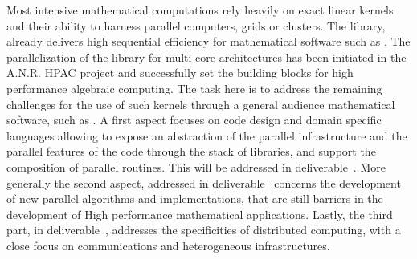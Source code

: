\begin{workpackage}
\begin{tasklist}
\begin{task}[title=Linbox,PM=40,id=hpc-linbox, lead=UJF,wphases={3-48!0.37,12-36}]
Most intensive mathematical computations rely heavily on exact linear kernels
and their ability to harness parallel computers, grids or clusters. The \Linbox
library, already delivers high sequential efficiency for mathematical software
such as \Sage. The parallelization of the library for multi-core architectures
has been initiated in the A.N.R. HPAC project and successfully set the building
blocks for high performance algebraic computing. 
The task here is to  address the remaining challenges for the use of such
kernels through a general audience mathematical software, such as \Sage.
A first aspect focuses on code design and domain specific languages allowing to
expose an abstraction of the parallel infrastructure and the parallel features
of the code through the stack of libraries, and support the
composition of parallel routines. This will be addressed in
deliverable~. More generally the second aspect, addressed
in deliverable~ concerns the 
development of new parallel algorithms and implementations, that are still
barriers in the development of High performance mathematical
applications. Lastly, the third part, in
deliverable~, addresses the specificities of  distributed
computing, with a close focus on communications and heterogeneous infrastructures.


\end{task}


\end{tasklist}
\end{workpackage}

